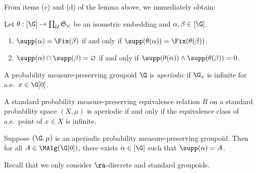 From items (c) and (d) of the lemma above, we immediately obtain:

\begin{corollary}\label{corollarysupportssofic}
Let $\theta:[\G]\to\prod_{\mathcal{U}}\mathfrak{S}_n$ be an isometric embedding and $\alpha,\beta\in[\G]$.
\begin{enumerate}
\item[(a)] $\supp(\alpha)=\Fix(\beta)$ if and only if $\supp(\theta(\alpha))=\Fix(\theta(\beta))$.
\item[(b)] $\supp(\alpha)\cap\supp(\beta)=\varnothing$ if and only if $\supp(\theta(\alpha))\land\supp(\theta(\beta))=0$.
\end{enumerate}
\end{corollary}

\begin{definition}
A probability measure-preserving groupoid $\G$ is \emph{aperiodic} if $\G_x$ is infinite for a.e.\ $x\in \G[0]$.
\end{definition}

\begin{example}
A standard probability measure-preserving equivalence relation $R$ on a standard probability space $(X,\mu)$ is aperiodic if and only if the equivalence class of a.e.\ point of $x\in X$ is infinite.
\end{example}

\begin{lemma}\label{lemmaaperiodicsupport}
Suppose $(\G,\mu)$ is an aperiodic probability measure-preserving groupoid. Then for all $A\in\MAlg(\G[0])$, there exists $\alpha\in[\G]$ such that $\supp(\alpha)=A$.
\end{lemma}

Recall that we only consider $\ra$-discrete and standard groupoids.

